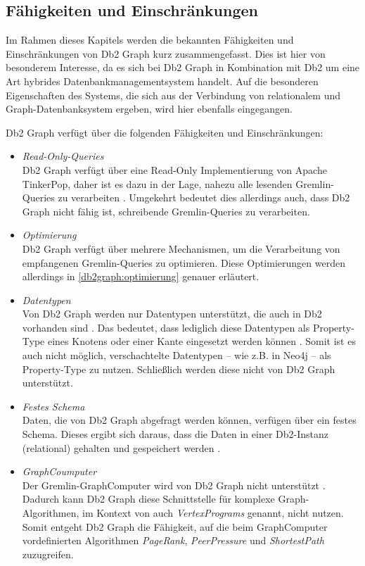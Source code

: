 \subsection{Fähigkeiten und Einschränkungen}
Im Rahmen dieses Kapitels werden die bekannten Fähigkeiten und Einschränkungen von Db2 Graph kurz zusammengefasst. Dies ist hier von besonderem Interesse, da es sich bei Db2 Graph in Kombination mit Db2 um eine Art hybrides Datenbankmanagementsystem handelt. Auf die besonderen Eigenschaften des Systems, die sich aus der Verbindung von relationalem und Graph-Datenbanksystem ergeben, wird hier ebenfalls eingegangen. 

Db2 Graph verfügt über die folgenden Fähigkeiten und Einschränkungen:

\begin{itemize}
    \item \textit{Read-Only-Queries}\\
    Db2 Graph verfügt über eine Read-Only Implementierung von Apache TinkerPop, daher ist es dazu in der Lage, nahezu alle lesenden Gremlin-Queries zu verarbeiten \cite{ibm_docs_limitiations}. Umgekehrt bedeutet dies allerdings auch, dass Db2 Graph nicht fähig ist, schreibende Gremlin-Queries zu verarbeiten.
    \item \textit{Optimierung}\\
    Db2 Graph verfügt über mehrere Mechanismen, um die Verarbeitung von empfangenen Gremlin-Queries zu optimieren. Diese Optimierungen werden allerdings in \autoref{db2graph:optimierung} genauer erläutert.
    \item \textit{Datentypen}\\
    Von Db2 Graph werden nur Datentypen unterstützt, die auch in Db2 vorhanden sind \cite{ibm_docs_limitiations}. Das bedeutet, dass lediglich diese Datentypen als Property-Type eines Knotens oder einer Kante eingesetzt werden können \cite{ibm_docs_limitiations}. Somit ist es auch nicht möglich, verschachtelte Datentypen -- wie z.B. in Neo4j -- als Property-Type zu nutzen. Schließlich werden diese nicht von Db2 Graph unterstützt.
    \item \textit{Festes Schema}\\
    Daten, die von Db2 Graph abgefragt werden können, verfügen über ein festes Schema. Dieses ergibt sich daraus, dass die Daten in einer Db2-Instanz (relational) gehalten und gespeichert werden \cite{sigmod_tian,vldb_tian,yt_tian}.
    \item \textit{GraphCoumputer}\\
    Der Gremlin-GraphComputer wird von Db2 Graph nicht unterstützt \cite{ibm_docs_limitiations}. Dadurch kann Db2 Graph diese Schnittstelle für komplexe Graph-Algorithmen, im Kontext von \cite{tinkerpop_2020} auch \textit{VertexPrograms} genannt, nicht nutzen. Somit entgeht Db2 Graph die Fähigkeit, auf die beim GraphComputer vordefinierten Algorithmen \textit{PageRank}, \textit{PeerPressure} und \textit{ShortestPath} zuzugreifen.
\end{itemize}

